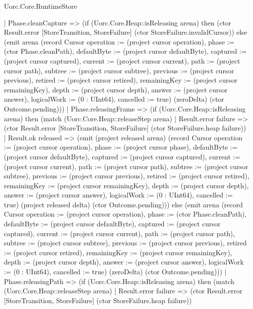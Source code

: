 \begin{lexlean}{Uorc.Core.RuntimeStore}
\begin{semanticmodule}
{    | Phase.cleanCapture => (if (Uorc.Core.Heap::isReleasing arena) then (ctor Result.error [StoreTransition, StoreFailure] (ctor StoreFailure.invalidCursor)) else (emit arena (record Cursor {operation := (project cursor operation), phase := (ctor Phase.cleanPath), defaultByte := (project cursor defaultByte), captured := (project cursor captured), current := (project cursor current), path := (project cursor path), subtree := (project cursor subtree), previous := (project cursor previous), retired := (project cursor retired), remainingKey := (project cursor remainingKey), depth := (project cursor depth), answer := (project cursor answer), logicalWork := (0 : UInt64), cancelled := true}) (zeroDelta) (ctor Outcome.pending)))
    | Phase.releasingFrame => (if (Uorc.Core.Heap::isReleasing arena) then (match (Uorc.Core.Heap::releaseStep arena)
      | Result.error failure => (ctor Result.error [StoreTransition, StoreFailure] (ctor StoreFailure.heap failure))
      | Result.ok released => (emit (project released arena) (record Cursor {operation := (project cursor operation), phase := (project cursor phase), defaultByte := (project cursor defaultByte), captured := (project cursor captured), current := (project cursor current), path := (project cursor path), subtree := (project cursor subtree), previous := (project cursor previous), retired := (project cursor retired), remainingKey := (project cursor remainingKey), depth := (project cursor depth), answer := (project cursor answer), logicalWork := (0 : UInt64), cancelled := true}) (project released delta) (ctor Outcome.pending))) else (emit arena (record Cursor {operation := (project cursor operation), phase := (ctor Phase.cleanPath), defaultByte := (project cursor defaultByte), captured := (project cursor captured), current := (project cursor current), path := (project cursor path), subtree := (project cursor subtree), previous := (project cursor previous), retired := (project cursor retired), remainingKey := (project cursor remainingKey), depth := (project cursor depth), answer := (project cursor answer), logicalWork := (0 : UInt64), cancelled := true}) (zeroDelta) (ctor Outcome.pending)))
    | Phase.releasingPath => (if (Uorc.Core.Heap::isReleasing arena) then (match (Uorc.Core.Heap::releaseStep arena)
      | Result.error failure => (ctor Result.error [StoreTransition, StoreFailure] (ctor StoreFailure.heap failure))
}
\end{semanticmodule}
\end{lexlean}
